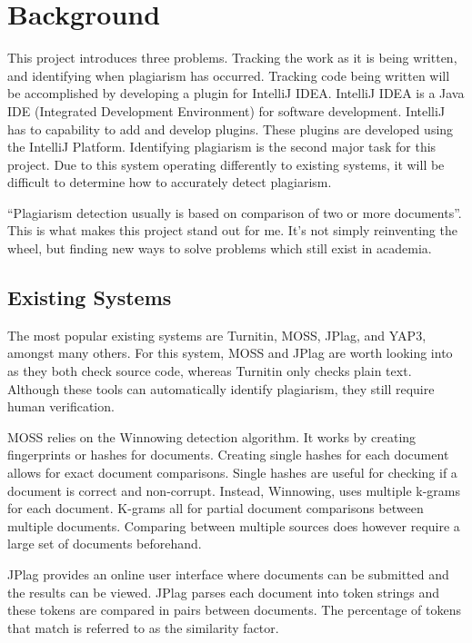\chapter{Background}
This project introduces three problems. Tracking the work as it is being written, and identifying when plagiarism has occurred. Tracking code being written will be accomplished by developing a plugin for IntelliJ IDEA. IntelliJ IDEA is a Java IDE (Integrated Development Environment) for software development. IntelliJ has to capability to add and develop plugins. These plugins are developed using the IntelliJ Platform\cite{IntelliJPlatform}. Identifying plagiarism is the second major task for this project. Due to this system operating differently to existing systems, it will be difficult to determine how to accurately detect plagiarism.

``Plagiarism detection usually is based on comparison of two or more documents''\cite{Lukashenko2007}. This is what makes this project stand out for me. It's not simply reinventing the wheel, but finding new ways to solve problems which still exist in academia. 

\section{Existing Systems}
\label{sec:existing-systems}
The most popular existing systems are Turnitin, MOSS, JPlag, and YAP3, amongst many others. For this system, MOSS and JPlag are worth looking into as they both check source code, whereas Turnitin only checks plain text\cite{Lukashenko2007}. Although these tools can automatically identify plagiarism, they still require human verification.

MOSS relies on the Winnowing detection algorithm. It works by creating fingerprints or hashes for documents\cite{Schleimer2003}. Creating single hashes for each document allows for exact document comparisons. Single hashes are useful for checking if a document is correct and non-corrupt. Instead, Winnowing, uses multiple k-grams for each document. K-grams all for partial document comparisons between multiple documents. Comparing between multiple sources does however require a large set of documents beforehand.

JPlag provides an online user interface where documents can be submitted and the results can be viewed. JPlag parses each document into token strings and these tokens are compared in pairs between documents. The percentage of tokens that match is referred to as the similarity factor\cite{Prechelt2003}. 

